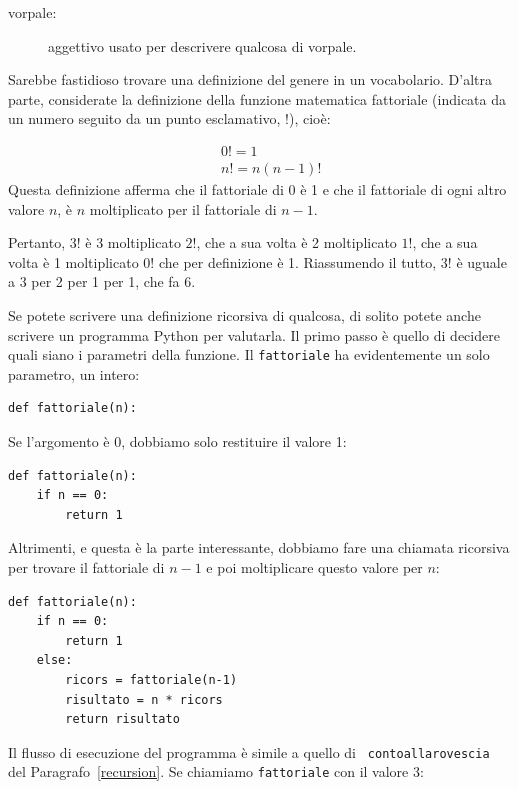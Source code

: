 \documentclass[10pt]{book}
\begin{document}
\begin{description}

\item[vorpale:] aggettivo usato per descrivere qualcosa di vorpale.

\end{description}

Sarebbe fastidioso trovare una definizione del genere in un vocabolario.
D'altra parte, considerate la definizione della funzione matematica    fattoriale (indicata da un numero seguito da un punto esclamativo, $!$), cioè:

%
\begin{eqnarray*}
&&  0! = 1 \\
&&  n! = n (n-1)!
\end{eqnarray*}
%
Questa definizione afferma che il fattoriale di 0 è 1 e che il fattoriale di ogni altro valore $n$, è $n$ moltiplicato per il fattoriale di $n-1$.

Pertanto, $3!$ è 3 moltiplicato $2!$, che a sua volta è 2 moltiplicato $1!$, che
   a sua volta è 1 moltiplicato $0!$ che per definizione è 1. Riassumendo il tutto, $3!$ è uguale a 3 per 2 per 1 per 1, che fa 6.

Se potete scrivere una definizione ricorsiva di qualcosa, di solito potete anche scrivere un programma Python per valutarla. Il primo passo è quello di decidere
quali siano i parametri della funzione. Il {\tt fattoriale} ha evidentemente un solo parametro, un intero:

\begin{verbatim}
def fattoriale(n):
\end{verbatim}
%
Se l'argomento è 0, dobbiamo solo restituire il valore 1:

\begin{verbatim}
def fattoriale(n):
    if n == 0:
        return 1
\end{verbatim}
%
Altrimenti, e questa è la parte interessante, dobbiamo fare una chiamata ricorsiva per trovare il fattoriale di $n-1$ e poi moltiplicare questo valore per $n$:

\begin{verbatim}
def fattoriale(n):
    if n == 0:
        return 1
    else:
        ricors = fattoriale(n-1)
        risultato = n * ricors
        return risultato
\end{verbatim}
%
Il flusso di esecuzione del programma è simile a quello di {\tt
contoallarovescia} del Paragrafo~\ref{recursion}. Se chiamiamo {\tt fattoriale}
con il valore 3:
\end{document}
